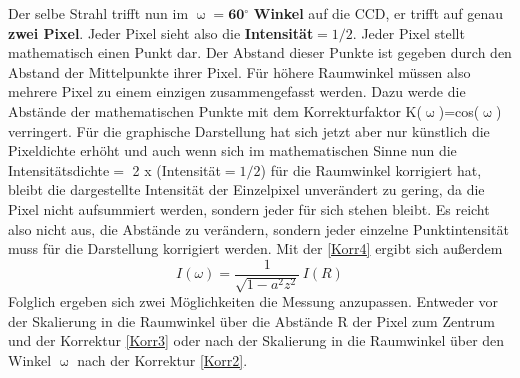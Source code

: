 Der selbe Strahl trifft nun im $\upomega=\textbf{60$^\circ$}$ \textbf{Winkel} auf die CCD, er trifft  auf genau \textbf{zwei Pixel}. Jeder Pixel sieht also die \textbf{Intensität$=1/2$}.
Jeder Pixel stellt mathematisch einen Punkt dar. Der Abstand dieser Punkte ist gegeben durch den Abstand der Mittelpunkte ihrer Pixel. Für höhere Raumwinkel müssen also mehrere Pixel zu einem einzigen zusammengefasst werden. Dazu werde die  Abstände der mathematischen Punkte mit dem Korrekturfaktor K($\upomega$)=cos($\upomega$) verringert. Für die graphische Darstellung hat sich jetzt aber nur künstlich die Pixeldichte erhöht und auch wenn sich im mathematischen Sinne nun die Intensitätsdichte$=$ 2 x (Intensität$=1/2$) für die Raumwinkel korrigiert hat, bleibt die dargestellte Intensität der Einzelpixel unverändert zu gering, da die Pixel nicht aufsummiert werden, sondern jeder für sich stehen bleibt. Es reicht also nicht aus, die Abstände zu verändern, sondern jeder einzelne Punktintensität muss für die Darstellung korrigiert werden.
Mit der \autoref{Korr4} ergibt sich außerdem
\begin{equation}
I(\omega)= \frac{1}{\sqrt{1-a^2z^2}} \, I(R)
\label{Korr3}
\end{equation}
Folglich ergeben sich zwei Möglichkeiten die Messung anzupassen.
Entweder vor der Skalierung in die Raumwinkel über die Abstände R der Pixel zum Zentrum und der Korrektur \autoref{Korr3} oder nach der Skalierung in die Raumwinkel über den Winkel $\upomega$ nach der Korrektur \autoref{Korr2}.
\newpage
